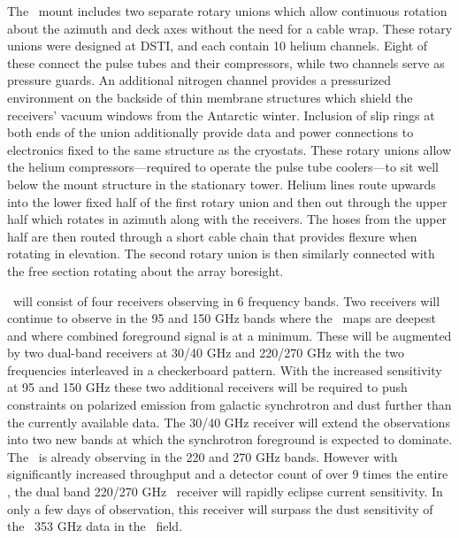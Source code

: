 \documentclass[]{spie}  %
\begin{document}
The \biceparray\ mount includes two separate rotary unions which allow
continuous rotation about the azimuth and deck axes without the need for a
cable wrap. These rotary unions were designed at DSTI, and each contain 10
helium channels. Eight of these connect the pulse tubes and their compressors,
while two channels serve as pressure guards. An additional nitrogen channel
provides a pressurized environment on the backside of thin membrane
structures which shield the receivers' vacuum windows from the Antarctic winter.
Inclusion of slip rings at both ends of the union additionally provide data and power
connections to electronics fixed to the same structure as the cryostats. These rotary
unions allow the helium compressors---required to operate the
pulse tube coolers---to sit well below the mount structure in the
stationary tower. Helium lines route upwards into the lower fixed half of the first
rotary union and then out through the upper half which rotates in azimuth
along with the receivers. The hoses from the upper half are then routed through a
short cable chain that provides flexure when rotating in elevation. The
second rotary union is then similarly connected with the free section rotating
about the array boresight.



\biceparray\ will consist of four receivers observing in 6 frequency bands.
Two receivers will continue to observe in the 95 and 150 GHz bands where the
\bk\ maps are deepest and where combined foreground
signal is at a minimum. These will be augmented by two dual-band receivers at
30/40 GHz and 220/270 GHz with the two frequencies interleaved in a
checkerboard pattern. With the increased sensitivity at 95 and 150 GHz these
two additional receivers will be required to push constraints on polarized
emission from galactic synchrotron and dust further than the currently available data.
The 30/40 GHz receiver will extend the observations into two
new bands at which the synchrotron foreground is expected to dominate. The
\keckarray\ is already observing in the 220 and 270 GHz bands.  However with
significantly increased throughput and a detector count of over 9 times the
entire \keckarray, the dual band 220/270 GHz \biceparray\ receiver will rapidly
eclipse current sensitivity. In only a few days of observation,
this receiver will surpass the dust sensitivity of the \planck\ 353 GHz data in
the \bk\ field. 
\end{document}
